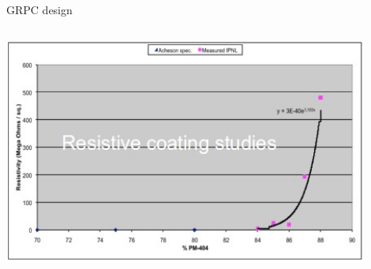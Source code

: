\documentclass[10pt]{beamer}
\begin{document}
\begin{frame}{GRPC design}
\begin{columns}
\begin{column}{0.45\textwidth}
      \centerline{\includegraphics[width=0.9\textwidth]{jpg/CoatingStudies}}
    \end{column}
  \end{columns}
  

\end{frame}
\end{document}
